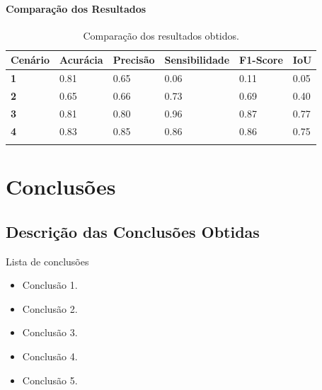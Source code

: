 \documentclass[%
  10pt,%
  aspectratio = 169,%
  compress,%
  t,%
  english,%
  brazilian,%
  tikz,
]{beamer}
\begin{document}
\begin{frame}
\framesubtitle{Comparação dos Resultados}

\begin{table}[!ht]
    \centering
    \caption{Comparação dos resultados obtidos.}%
    \label{tab:res:comparacao}%
    \begin{tabular}{llllll}
    \toprule
        \textbf{Cenário} & \textbf{Acurácia} & \textbf{Precisão} & \textbf{Sensibilidade} & \textbf{F1-Score} & \textbf{IoU} \\
        \midrule
        \textbf{1} & \colorbox{green!25}{0.81} & 0.65 & 0.06 & 0.11 & 0.05 \\ 
        \textbf{2} & \colorbox{red!25}{0.65} & 0.66 & 0.73 & 0.69 & 0.40 \\ 
        \textbf{3} & 0.81 & 0.80 & 0.96 & 0.87 & 0.77 \\ 
        \textbf{4} & 0.83 & 0.85 & 0.86 & 0.86 & 0.75 \\ 
        \bottomrule
        \addlinespace
    \end{tabular}
\end{table}

\end{frame}



\section{Conclusões}\label{sec:concl}

\subsection{Descrição das Conclusões Obtidas}\label{ssec:concl1}

\begin{frame}
\begin{block}{Lista de conclusões}
\begin{itemize}
\item Conclusão 1.
\item Conclusão 2.
\item Conclusão 3.
\item Conclusão 4.
\item Conclusão 5.
\end{itemize}
\end{block}
\end{frame}
\end{document}
